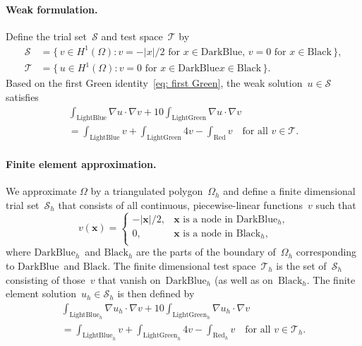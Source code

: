 \documentclass[a4paper,12pt]{article}
\begin{document}
\paragraph{Weak formulation.}
Define the trial set~$\mathcal{S}$ and test space~$\mathcal{T}$ by
\begin{align*}
\mathcal{S}&=\{\,v\in H^1(\Omega):
\text{$v=-|x|/2$ for $x\in\text{DarkBlue}$, $v=0$ for 
$x\in\text{Black}$}\,\},\\
\mathcal{T}&=\{\,u\in H^1(\Omega):
\text{$v=0$ for $x\in\text{DarkBlue}$
$x\in\text{Black}$}\,\}.
\end{align*}
Based on the first Green identity~\eqref{eq: first Green}, the weak 
solution~$u\in\mathcal{S}$ satisfies
\begin{multline*}
\int_{\text{LightBlue}}\nabla u\cdot\nabla v
	+10\int_{\text{LightGreen}}\nabla u\cdot\nabla v\\
	=\int_{\text{LightBlue}}v+\int_{\text{LightGreen}}4v
	-\int_{\text{Red}}v
\quad\text{for all $v\in\mathcal{T}$.}
\end{multline*}

\paragraph{Finite element approximation.} 
We approximate $\Omega$ by a triangulated polygon~$\Omega_h$ and 
define a finite dimensional trial set~$\mathcal{S}_h$ that consists 
of all continuous, piecewise-linear functions~$v$ such that 
\[
v(\boldsymbol{x})=\begin{cases}
-|\boldsymbol{x}|/2,&
\text{$\boldsymbol{x}$ is a node in~$\text{DarkBlue}_h$,}\\
0,&\text{$\boldsymbol{x}$ is a node in~$\text{Black}_h$,}\\
\end{cases}
\]
where $\text{DarkBlue}_h$~and $\text{Black}_h$ are the parts
of the boundary of~$\Omega_h$ corresponding to $\text{DarkBlue}$~and 
$\text{Black}$.  The finite dimensional test 
space~$\mathcal{T}_h$ is the set of~$\mathcal{S}_h$ consisting of 
those~$v$ that vanish on~$\text{DarkBlue}_h$ (as well as 
on~$\text{Black}_h$.  The finite element 
solution~$u_h\in\mathcal{S}_h$ is then defined by
\begin{multline*}
\int_{\text{LightBlue}_h}\nabla u_h\cdot\nabla v
	+10\int_{\text{LightGreen}_h}\nabla u_h\cdot\nabla v\\
	=\int_{\text{LightBlue}_h}v+\int_{\text{LightGreen}_h}4v
	-\int_{\text{Red}_h}v
\quad\text{for all $v\in\mathcal{T}_h$.}
\end{multline*}
\end{document}

